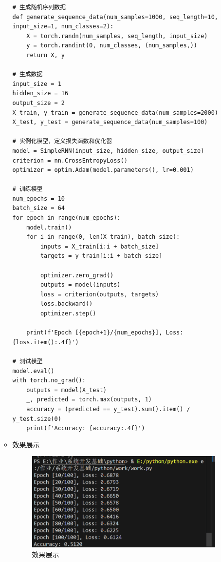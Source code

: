 \documentclass[UTF8]{ctexart}
\begin{document}
\begin{enumerate}
\begin{itemize}
\begin{verbatim}
# 生成随机序列数据
def generate_sequence_data(num_samples=1000, seq_length=10, input_size=1, num_classes=2):
    X = torch.randn(num_samples, seq_length, input_size)
    y = torch.randint(0, num_classes, (num_samples,))
    return X, y

# 生成数据
input_size = 1
hidden_size = 16
output_size = 2
X_train, y_train = generate_sequence_data(num_samples=2000)
X_test, y_test = generate_sequence_data(num_samples=100)

# 实例化模型，定义损失函数和优化器
model = SimpleRNN(input_size, hidden_size, output_size)
criterion = nn.CrossEntropyLoss()
optimizer = optim.Adam(model.parameters(), lr=0.001)

# 训练模型
num_epochs = 10
batch_size = 64
for epoch in range(num_epochs):
    model.train()
    for i in range(0, len(X_train), batch_size):
        inputs = X_train[i:i + batch_size]
        targets = y_train[i:i + batch_size]

        optimizer.zero_grad()
        outputs = model(inputs)
        loss = criterion(outputs, targets)
        loss.backward()
        optimizer.step()

    print(f'Epoch [{epoch+1}/{num_epochs}], Loss: {loss.item():.4f}')

# 测试模型
model.eval()
with torch.no_grad():
    outputs = model(X_test)
    _, predicted = torch.max(outputs, 1)
    accuracy = (predicted == y_test).sum().item() / y_test.size(0)
    print(f'Accuracy: {accuracy:.4f}')

  \end{verbatim}

\item 效果展示
  \begin{figure}[H]
    \centering
    \includegraphics[width=\textwidth]{335} %
    \caption{效果展示}
  \end{figure}
  \end{itemize}
\end{enumerate}
\end{document}
